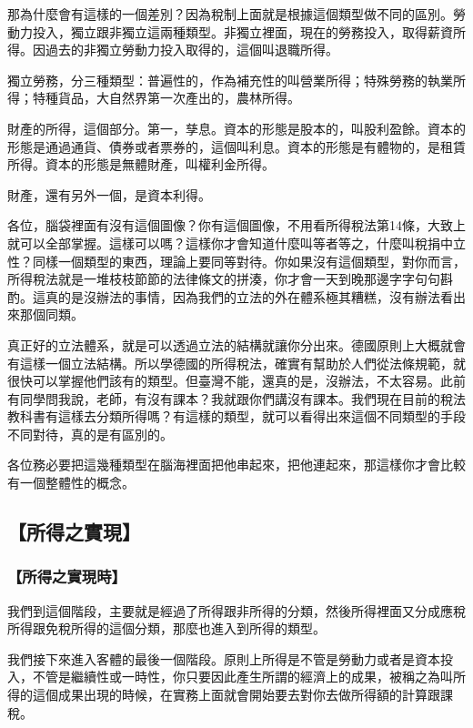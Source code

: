 \documentclass[oneside,sub3section]{ctexbook}
\begin{document}
那為什麼會有這樣的一個差別？因為稅制上面就是根據這個類型做不同的區別。勞動力投入，獨立跟非獨立這兩種類型。非獨立裡面，現在的勞務投入，取得薪資所得。因過去的非獨立勞動力投入取得的，這個叫退職所得。

獨立勞務，分三種類型：普遍性的，作為補充性的叫營業所得；特殊勞務的執業所得；特種貨品，大自然界第一次產出的，農林所得。

財產的所得，這個部分。第一，孳息。資本的形態是股本的，叫股利盈餘。資本的形態是通過通貨、債券或者票券的，這個叫利息。資本的形態是有體物的，是租賃所得。資本的形態是無體財產，叫權利金所得。

財產，還有另外一個，是資本利得。

各位，腦袋裡面有沒有這個圖像？你有這個圖像，不用看所得稅法第14條，大致上就可以全部掌握。這樣可以嗎？這樣你才會知道什麼叫等者等之，什麼叫稅捐中立性？同樣一個類型的東西，理論上要同等對待。你如果沒有這個類型，對你而言，所得稅法就是一堆枝枝節節的法律條文的拼湊，你才會一天到晚那邊字字句句斟酌。這真的是沒辦法的事情，因為我們的立法的外在體系極其糟糕，沒有辦法看出來那個同類。

真正好的立法體系，就是可以透過立法的結構就讓你分出來。德國原則上大概就會有這樣一個立法結構。所以學德國的所得稅法，確實有幫助於人們從法條規範，就很快可以掌握他們該有的類型。但臺灣不能，還真的是，沒辦法，不太容易。此前有同學問我說，老師，有沒有課本？我就跟你們講沒有課本。我們現在目前的稅法教科書有這樣去分類所得嗎？有這樣的類型，就可以看得出來這個不同類型的手段不同對待，真的是有區別的。

各位務必要把這幾種類型在腦海裡面把他串起來，把他連起來，那這樣你才會比較有一個整體性的概念。

\hypertarget{ux6240ux5f97ux4e4bux5be6ux73fe}{%
\subsection{【所得之實現】}\label{ux6240ux5f97ux4e4bux5be6ux73fe}}

\hypertarget{ux6240ux5f97ux4e4bux5be6ux73feux6642}{%
\subsubsection{【所得之實現時】}\label{ux6240ux5f97ux4e4bux5be6ux73feux6642}}

我們到這個階段，主要就是經過了所得跟非所得的分類，然後所得裡面又分成應稅所得跟免稅所得的這個分類，那麼也進入到所得的類型。

我們接下來進入客體的最後一個階段。原則上所得是不管是勞動力或者是資本投入，不管是繼續性或一時性，你只要因此產生所謂的經濟上的成果，被稱之為叫所得的這個成果出現的時候，在實務上面就會開始要去對你去做所得額的計算跟課稅。
\end{document}
